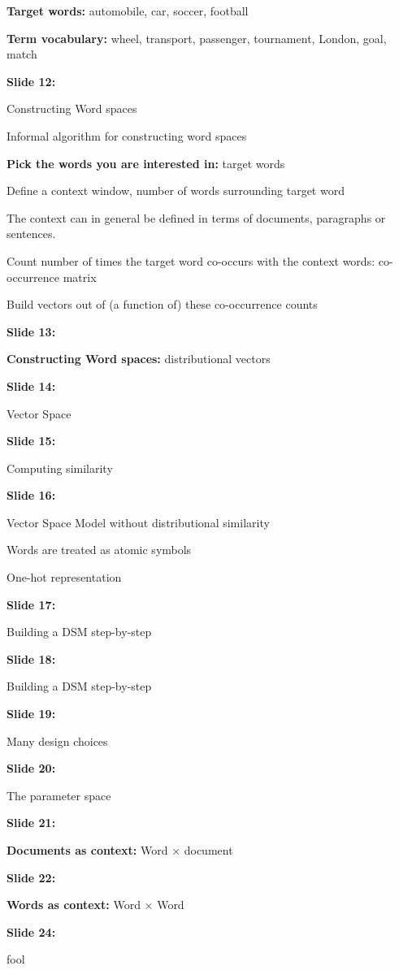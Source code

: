 \documentclass[11pt,a4paper]{article}
\begin{document}
\textbf{Target words:}  automobile, car, soccer, football

\textbf{Term vocabulary:}  wheel, transport, passenger, tournament, London, goal, match

\textbf{Slide 12:}

Constructing Word spaces

Informal algorithm for constructing word spaces

\textbf{Pick the words you are interested in:}   target words

Define a context window, number of words surrounding target word

The context can in general be defined in terms of documents, paragraphs or sentences.

Count number of times the target word co-occurs with the context words: co-occurrence matrix

Build vectors out of (a function of) these co-occurrence counts

\textbf{Slide 13:}

\textbf{Constructing Word spaces:}  distributional vectors

\textbf{Slide 14:}

Vector Space

\textbf{Slide 15:}

Computing similarity

\textbf{Slide 16:}

Vector Space Model without distributional similarity

Words are treated as atomic symbols

One-hot representation

\textbf{Slide 17:}

Building a DSM step-by-step

\textbf{Slide 18:}

Building a DSM step-by-step

\textbf{Slide 19:}

Many design choices

\textbf{Slide 20:}

The parameter space

\textbf{Slide 21:}

\textbf{Documents as context:}  Word × document

\textbf{Slide 22:}

\textbf{Words as context:}  Word × Word

\textbf{Slide 24:}

fool
\end{document}
